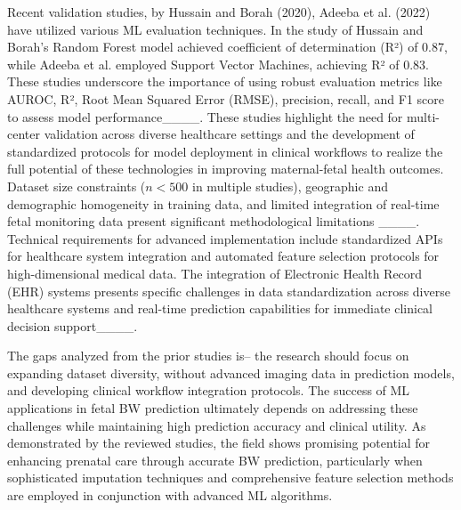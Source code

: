Recent validation studies, by Hussain and Borah (2020), Adeeba et al. (2022) have utilized various ML evaluation techniques. In the study of Hussain and Borah's Random Forest model achieved coefficient of determination (R²) of 0.87, while Adeeba et al. employed Support Vector Machines, achieving R² of 0.83. These studies underscore the importance of using robust evaluation metrics like AUROC, R², Root Mean Squared Error (RMSE), precision, recall, and F1 score to assess model performance____. These studies highlight the need for multi-center validation across diverse healthcare settings and the development of standardized protocols for model deployment in clinical workflows to realize the full potential of these technologies in improving maternal-fetal health outcomes. Dataset size constraints ($n<500$ in multiple studies), geographic and demographic homogeneity in training data, and limited integration of real-time fetal monitoring data present significant methodological limitations ____. Technical requirements for advanced implementation include standardized APIs for healthcare system integration and automated feature selection protocols for high-dimensional medical data. The integration of Electronic Health Record (EHR) systems presents specific challenges in data standardization across diverse healthcare systems and real-time prediction capabilities for immediate clinical decision support____. 

The gaps analyzed from the prior studies is– the research should focus on expanding dataset diversity, without advanced imaging data in prediction models, and developing clinical workflow integration protocols. The success of ML applications in fetal BW prediction ultimately depends on addressing these challenges while maintaining high prediction accuracy and clinical utility. As demonstrated by the reviewed studies, the field shows promising potential for enhancing prenatal care through accurate BW prediction, particularly when sophisticated imputation techniques and comprehensive feature selection methods are employed in conjunction with advanced ML algorithms.